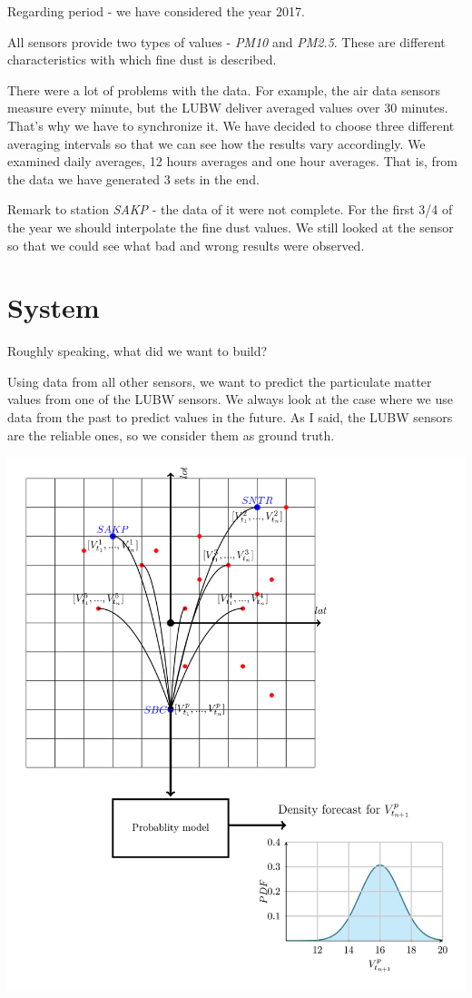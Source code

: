 \documentclass[margin=0.01in]{article}
\begin{document}
Regarding period - we have considered the year 2017.

All sensors provide two types of values - \emph{PM10} and \emph{PM2.5}. These are different characteristics with which fine dust is described.

There were a lot of problems with the data. For example, the air data sensors measure every minute, but the LUBW deliver averaged values over 30 minutes. That's why we have to synchronize it. We have decided to choose three different averaging intervals so that we can see how the results vary accordingly. We examined daily averages, 12 hours averages and one hour averages. That is, from the data we have generated 3 sets in the end.

Remark to station \emph{SAKP} - the data of it were not complete. For the first 3/4 of the year we should interpolate the fine dust values. We still looked at the sensor so that we could see what bad and wrong results were observed.


\section{System}
\label{sec:org7db140a}
Roughly speaking, what did we want to build?

Using data from all other sensors, we want to predict the particulate matter values from one of the LUBW sensors. We always look at the case where we use data from the past to predict values in the future. As I said, the LUBW sensors are the reliable ones, so we consider them as ground truth.

\begin{center}
\includegraphics[width=.9\linewidth]{../images/general_system.png}
\end{center}
\end{document}
